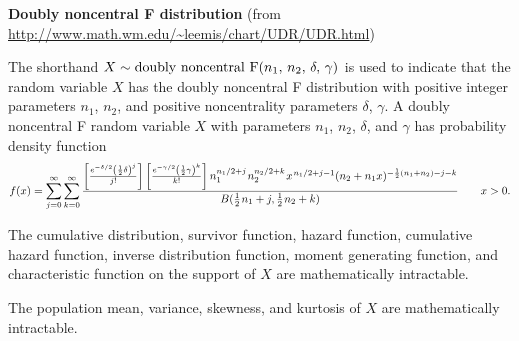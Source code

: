\documentclass[12pt,fullpage]{article}
\begin{document}
\noindent
{\bf Doubly noncentral F distribution} (from \color{blue}\url{http://www.math.wm.edu/~leemis/chart/UDR/UDR.html}\color{black})

\noindent
The shorthand $X \sim {\rm doubly\  noncentral\  F}(n_1,\, n_2,\, \delta,\, \gamma)$ is used to indicate that the
random variable $X$ has the doubly noncentral F distribution with positive integer parameters $n_1$, $n_2$, and positive noncentrality parameters $\delta$, $\gamma$.
A doubly noncentral F random variable $X$ with parameters $n_1$, $n_2$, $\delta$, and $\gamma$ has probability density function 
$$
f(x) = \sum _{j = 0} ^ {\infty } \sum _{k = 0} ^ {\infty } \frac{\left[\frac{e ^ {-\delta / 2}\left(\frac{1} {2} \delta \right) ^ j}{j !}\right]
	\left[\frac{e ^ {-\gamma / 2}\left(\frac{1} {2}\gamma \right) ^ k}{k !}\right]n_1 ^ {n_1 / 2 + j} \kern 0.08 em n_2 ^ {n_2 / 2 + k} \kern 0.08 em x ^ {\kern 0.08 em n_1 / 2 + j - 1}
	(n_2 + n_1 x) ^ {-\frac{1} {2}(n_1 + n_2) - j - k}}{B (\frac{1} {2} \kern 0.08 em n_1 + j, \frac{1} {2} \kern 0.08 em n_2 + k)}
 \quad \quad x>0.
$$

\vspace{0.1in}
\noindent
The cumulative distribution, survivor function, hazard function, cumulative hazard 
function, inverse distribution function, moment generating function, and characteristic function
on the support of $X$ are mathematically intractable.

\vspace{0.1in}
\noindent
The population mean, variance, skewness, and kurtosis of $X$ are mathematically intractable.

\vspace{0.1in}

\noindent
\end{document}
